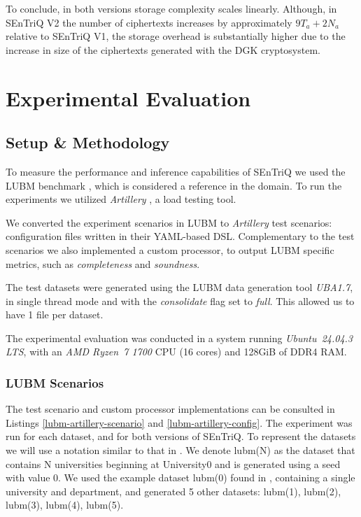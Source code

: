 To conclude, in both versions storage complexity scales linearly. Although, in \gls{SEnTriQ} V2 the number of ciphertexts increases by approximately $9T_a + 2N_a$ relative to \gls{SEnTriQ} V1, the storage overhead is substantially higher due to the increase in size of the ciphertexts generated with the \gls{DGK} cryptosystem.

\section{Experimental Evaluation}
\label{ch5:setup-methodology}

\subsection{Setup \& Methodology} 

To measure the performance and inference capabilities of \gls{SEnTriQ} we used the \gls{LUBM} benchmark \autocite{Guo2005-ja}, which is considered a reference in the domain. To run the experiments we utilized \emph{Artillery} \autocite{Talk-to-salesUnknown-oe}, a load testing tool. 

We converted the experiment scenarios in \gls{LUBM} to \emph{Artillery} test scenarios: configuration files written in their YAML-based \gls{DSL}. Complementary to the test scenarios we also implemented a custom processor, to output \gls{LUBM} specific metrics, such as \emph{completeness} and \emph{soundness}.

The test datasets were generated using the \gls{LUBM} data generation tool \emph{UBA1.7}, in single thread mode and with the \emph{consolidate} flag set to \emph{full}. This allowed us to have 1 file per dataset.

The experimental evaluation was conducted in a system running \emph{Ubuntu~24.04.3 LTS}, with an \emph{AMD Ryzen~7 1700} CPU (16 cores) and 128GiB of DDR4 RAM.

\subsubsection{LUBM Scenarios}

The test scenario and custom processor implementations can be consulted in Listings \ref{lubm-artillery-scenario} and \ref{lubm-artillery-config}. The experiment was run for each dataset, and for both versions of \gls{SEnTriQ}. To represent the datasets we will use a notation similar to that in \autocite{Guo2005-ja}. We denote lubm(N) as the dataset that contains N universities beginning at University0 and is generated using a seed with value 0. We used the example dataset lubm(0) found in \autocite{UnknownUnknown-ni}, containing a single university and department, and generated 5 other datasets: lubm(1), lubm(2), lubm(3), lubm(4), lubm(5). 

